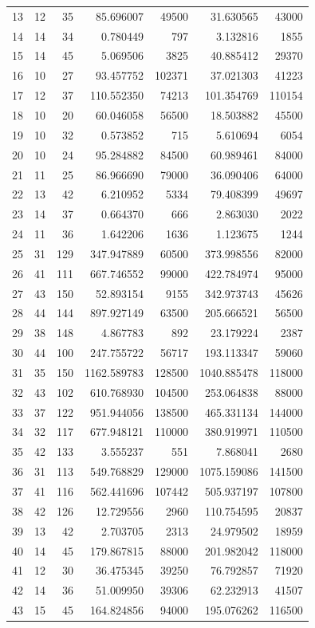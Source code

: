 \documentclass{article}
\begin{document}
\begin{landscape}
\begin{longtable}{rrrrrrr}
13 & 12 & 35 & 85.696007 & 49500 & 31.630565 & 43000 \\
14 & 14 & 34 & 0.780449 & 797 & 3.132816 & 1855 \\
15 & 14 & 45 & 5.069506 & 3825 & 40.885412 & 29370 \\
16 & 10 & 27 & 93.457752 & 102371 & 37.021303 & 41223 \\
17 & 12 & 37 & 110.552350 & 74213 & 101.354769 & 110154 \\
18 & 10 & 20 & 60.046058 & 56500 & 18.503882 & 45500 \\
19 & 10 & 32 & 0.573852 & 715 & 5.610694 & 6054 \\
20 & 10 & 24 & 95.284882 & 84500 & 60.989461 & 84000 \\
21 & 11 & 25 & 86.966690 & 79000 & 36.090406 & 64000 \\
22 & 13 & 42 & 6.210952 & 5334 & 79.408399 & 49697 \\
23 & 14 & 37 & 0.664370 & 666 & 2.863030 & 2022 \\
24 & 11 & 36 & 1.642206 & 1636 & 1.123675 & 1244 \\
25 & 31 & 129 & 347.947889 & 60500 & 373.998556 & 82000 \\
26 & 41 & 111 & 667.746552 & 99000 & 422.784974 & 95000 \\
27 & 43 & 150 & 52.893154 & 9155 & 342.973743 & 45626 \\
28 & 44 & 144 & 897.927149 & 63500 & 205.666521 & 56500 \\
29 & 38 & 148 & 4.867783 & 892 & 23.179224 & 2387 \\
30 & 44 & 100 & 247.755722 & 56717 & 193.113347 & 59060 \\
31 & 35 & 150 & 1162.589783 & 128500 & 1040.885478 & 118000 \\
32 & 43 & 102 & 610.768930 & 104500 & 253.064838 & 88000 \\
33 & 37 & 122 & 951.944056 & 138500 & 465.331134 & 144000 \\
34 & 32 & 117 & 677.948121 & 110000 & 380.919971 & 110500 \\
35 & 42 & 133 & 3.555237 & 551 & 7.868041 & 2680 \\
36 & 31 & 113 & 549.768829 & 129000 & 1075.159086 & 141500 \\
37 & 41 & 116 & 562.441696 & 107442 & 505.937197 & 107800 \\
38 & 42 & 126 & 12.729556 & 2960 & 110.754595 & 20837 \\
39 & 13 & 42 & 2.703705 & 2313 & 24.979502 & 18959 \\
40 & 14 & 45 & 179.867815 & 88000 & 201.982042 & 118000 \\
41 & 12 & 30 & 36.475345 & 39250 & 76.792857 & 71920 \\
42 & 14 & 36 & 51.009950 & 39306 & 62.232913 & 41507 \\
43 & 15 & 45 & 164.824856 & 94000 & 195.076262 & 116500 \\
\end{longtable}


\end{landscape}
\end{document}

